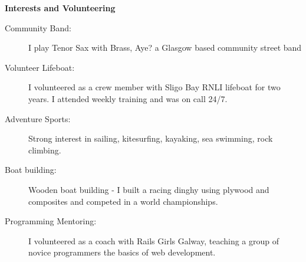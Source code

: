 \documentclass[letterpaper,11pt]{article}
\newcommand{\resheading}[1]{{\large \colorbox{mygrey}{\begin{minipage}{\textwidth}{\textbf{#1 \vphantom{p\^{E}}}}\end{minipage}}}}
\begin{document}
\resheading{Interests and Volunteering}
	\begin{description}
		\item[Community Band:] I play Tenor Sax with Brass, Aye? a Glasgow based community street band
		\item[Volunteer Lifeboat:] I volunteered as a crew member with Sligo Bay RNLI lifeboat for two years. I attended weekly training and was on call 24/7.
		\item[Adventure Sports:] Strong interest in sailing, kitesurfing, kayaking, sea swimming, rock climbing.
		\item[Boat building:] Wooden boat building - I built a racing dinghy using plywood and composites and competed in a world championships.
		\item[Programming Mentoring:] I volunteered as a coach with Rails Girls Galway, teaching a group of novice programmers the basics of web development.

	\end{description} %
\end{document}
